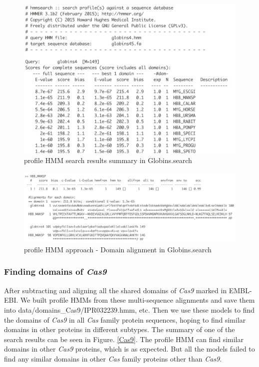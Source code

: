 \documentclass[11pt, oneside]{article}
\begin{document}
\begin{figure}[ht]
  \centering
  \includegraphics[scale = 0.35]{images/hmm_test1}
      \caption{profile HMM search results summary in Globins.search}
      \label{hmm_test1}
\end{figure} 

\begin{figure}[ht]
  \centering
  \includegraphics[scale = 0.3]{images/hmm_test2}
      \caption{profile HMM approach -  Domain alignment in Globins.search}
      \label{hmm_test2}
\end{figure} 


\subsubsection{Finding domains of \textit{Cas9}}

After subtracting and aligning all the shared domains of \textit{Cas9} marked in EMBL-EBI. We built profile HMMs from these multi-sequence alignments and save them into data/domains\_Cas9/IPR032239.hmm, etc. Then we use these models to find the domains of \textit{Cas9} in all \textit{Cas} family protein sequences, hoping to find similar domains in other proteins in different subtypes. The summary of one of the search results can be seen in Figure. \ref{Cas9}. The profile HMM can find similar domains in other \textit{Cas9} proteins, which is as expected. But all the models failed to find any similar domains in other \textit{Cas} family proteins other than \textit{Cas9}.
\end{document}
